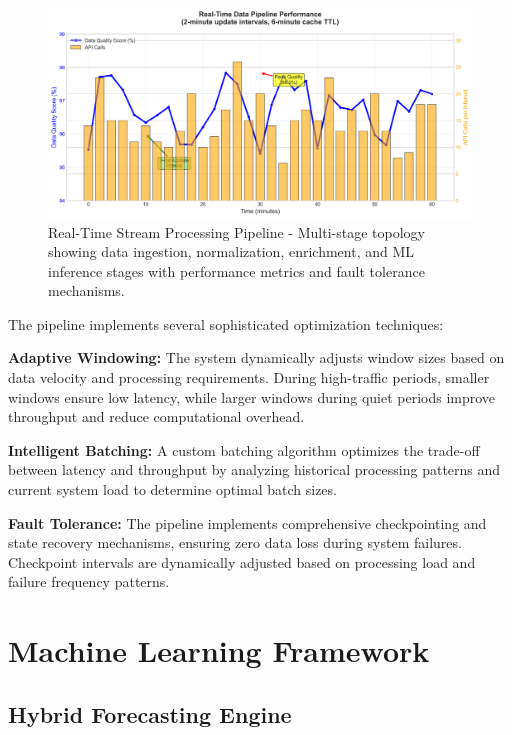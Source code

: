 \documentclass[conference]{IEEEtran}
\begin{document}
\begin{figure}[h]
    \centering
    \begin{mdframed}[style=imagestyle]
        \includegraphics[width=\columnwidth]{docs/images/realtime_pipeline.png}
    \end{mdframed}
    \caption{Real-Time Stream Processing Pipeline - Multi-stage topology showing data ingestion, normalization, enrichment, and ML inference stages with performance metrics and fault tolerance mechanisms.}
    \label{fig:pipeline}
\end{figure}

The pipeline implements several sophisticated optimization techniques:

\textbf{Adaptive Windowing:} The system dynamically adjusts window sizes based on data velocity and processing requirements. During high-traffic periods, smaller windows ensure low latency, while larger windows during quiet periods improve throughput and reduce computational overhead.

\textbf{Intelligent Batching:} A custom batching algorithm optimizes the trade-off between latency and throughput by analyzing historical processing patterns and current system load to determine optimal batch sizes.

\textbf{Fault Tolerance:} The pipeline implements comprehensive checkpointing and state recovery mechanisms, ensuring zero data loss during system failures. Checkpoint intervals are dynamically adjusted based on processing load and failure frequency patterns.

\section{Machine Learning Framework}

\subsection{Hybrid Forecasting Engine}
\end{document}
